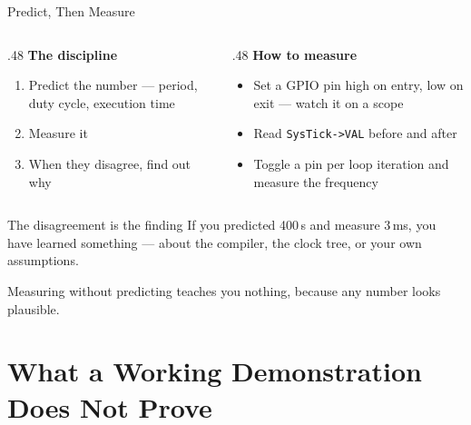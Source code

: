 \documentclass[9pt,aspectratio=169,xcolor=table]{beamer}
\begin{document}
\begin{frame}{Predict, Then Measure}
    \begin{columns}[T]
    \begin{column}{.48\textwidth}
        \textbf{The discipline}
        \begin{enumerate}
            \item \alert{Predict} the number --- period, duty cycle, execution
                  time
            \item \alert{Measure} it
            \item When they disagree, \alert{find out why}
        \end{enumerate}
    \end{column}
    \begin{column}{.48\textwidth}
        \textbf{How to measure}
        {\small
        \begin{itemize}\itemsep1pt
            \item Set a GPIO pin high on entry, low on exit --- watch it on a
                  scope
            \item Read \texttt{SysTick->VAL} before and after
            \item Toggle a pin per loop iteration and measure the frequency
        \end{itemize}}
    \end{column}
    \end{columns}

    \vspace{3mm}
    \begin{block}{The disagreement is the finding}
        If you predicted 400\,\textmu s and measure 3\,ms, you have learned
        something --- about the compiler, the clock tree, or your own assumptions.

        \vspace{1mm}
        \alert{Measuring without predicting teaches you nothing}, because any
        number looks plausible.
    \end{block}
\end{frame}


\section{What a Working Demonstration Does Not Prove}
\end{document}

